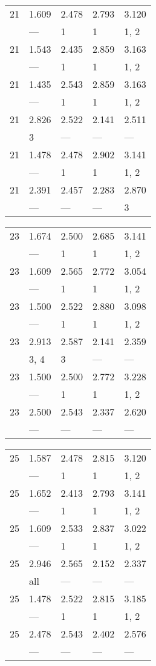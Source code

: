 \begin{tabular}{lllll}
\toprule
 21 & 1.609 & 2.478 & 2.793 & 3.120 \\
    & ---   & 1     & 1     & 1, 2  \\
 21 & 1.543 & 2.435 & 2.859 & 3.163 \\
    & ---   & 1     & 1     & 1, 2  \\
 21 & 1.435 & 2.543 & 2.859 & 3.163 \\
    & ---   & 1     & 1     & 1, 2  \\
 21 & 2.826 & 2.522 & 2.141 & 2.511 \\
    & 3     & ---   & ---   & ---   \\
 21 & 1.478 & 2.478 & 2.902 & 3.141 \\
    & ---   & 1     & 1     & 1, 2  \\
 21 & 2.391 & 2.457 & 2.283 & 2.870 \\
    & ---   & ---   & ---   & 3     \\
\bottomrule
\end{tabular}
\begin{tabular}{lllll}
\toprule
 23 & 1.674 & 2.500 & 2.685 & 3.141 \\
    & ---   & 1     & 1     & 1, 2  \\
 23 & 1.609 & 2.565 & 2.772 & 3.054 \\
    & ---   & 1     & 1     & 1, 2  \\
 23 & 1.500 & 2.522 & 2.880 & 3.098 \\
    & ---   & 1     & 1     & 1, 2  \\
 23 & 2.913 & 2.587 & 2.141 & 2.359 \\
    & 3, 4  & 3     & ---   & ---   \\
 23 & 1.500 & 2.500 & 2.772 & 3.228 \\
    & ---   & 1     & 1     & 1, 2  \\
 23 & 2.500 & 2.543 & 2.337 & 2.620 \\
    & ---   & ---   & ---   & ---   \\
\bottomrule
\end{tabular}
\begin{tabular}{lllll}
\toprule
 25 & 1.587 & 2.478 & 2.815 & 3.120 \\
    & ---   & 1     & 1     & 1, 2  \\
 25 & 1.652 & 2.413 & 2.793 & 3.141 \\
    & ---   & 1     & 1     & 1, 2  \\
 25 & 1.609 & 2.533 & 2.837 & 3.022 \\
    & ---   & 1     & 1     & 1, 2  \\
 25 & 2.946 & 2.565 & 2.152 & 2.337 \\
    & all   & ---   & ---   & ---   \\
 25 & 1.478 & 2.522 & 2.815 & 3.185 \\
    & ---   & 1     & 1     & 1, 2  \\
 25 & 2.478 & 2.543 & 2.402 & 2.576 \\
    & ---   & ---   & ---   & ---   \\
\bottomrule
\end{tabular}
